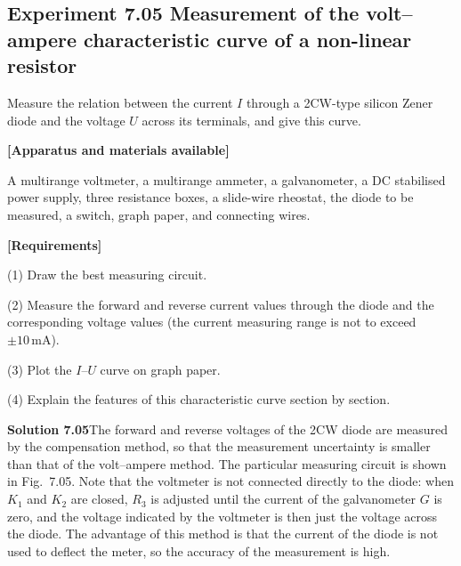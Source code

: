 \subsection*{Experiment 7.05 \quad Measurement of the volt--ampere characteristic curve of a non-linear resistor}

Measure the relation between the current $I$ through a 2CW-type silicon Zener diode and the voltage $U$ across its terminals, and give this curve.

\textbf{[Apparatus and materials available]}

A multirange voltmeter, a multirange ammeter, a galvanometer, a DC stabilised power supply, three resistance boxes, a slide-wire rheostat, the diode to be measured, a switch, graph paper, and connecting wires.

\textbf{[Requirements]}

(1) Draw the best measuring circuit.

(2) Measure the forward and reverse current values through the diode and the corresponding voltage values (the current measuring range is not to exceed $\pm10\,\mathrm{mA}$).

(3) Plot the $I$--$U$ curve on graph paper.

(4) Explain the features of this characteristic curve section by section.

\textbf{Solution 7.05}\quad The forward and reverse voltages of the 2CW diode are measured by the compensation method, so that the measurement uncertainty is smaller than that of the volt--ampere method. The particular measuring circuit is shown in Fig.~7.05. Note that the voltmeter is not connected directly to the diode: when $K_1$ and $K_2$ are closed, $R_3$ is adjusted until the current of the galvanometer $G$ is zero, and the voltage indicated by the voltmeter is then just the voltage across the diode. The advantage of this method is that the current of the diode is not used to deflect the meter, so the accuracy of the measurement is high.

